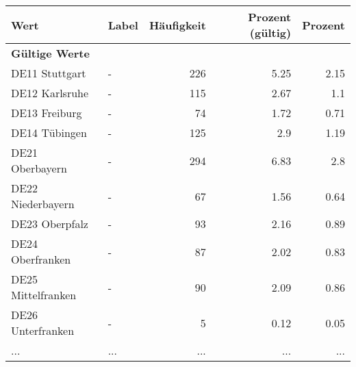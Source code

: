      \begin{longtable}{Xlrrr}
     \toprule
     \textbf{Wert} & \textbf{Label} & \textbf{Häufigkeit} & \textbf{Prozent (gültig)} & \textbf{Prozent} \\
     \endhead
     \midrule
     \multicolumn{5}{l}{\textbf{Gültige Werte}}\\
        \multicolumn{1}{X}{DE11 Stuttgart} & - & \num{226} & \num[round-mode=places,round-precision=2]{5.25} & \num[round-mode=places,round-precision=2]{2.15} \\
        \multicolumn{1}{X}{DE12 Karlsruhe} & - & \num{115} & \num[round-mode=places,round-precision=2]{2.67} & \num[round-mode=places,round-precision=2]{1.1} \\
        \multicolumn{1}{X}{DE13 Freiburg} & - & \num{74} & \num[round-mode=places,round-precision=2]{1.72} & \num[round-mode=places,round-precision=2]{0.71} \\
        \multicolumn{1}{X}{DE14 Tübingen} & - & \num{125} & \num[round-mode=places,round-precision=2]{2.9} & \num[round-mode=places,round-precision=2]{1.19} \\
        \multicolumn{1}{X}{DE21 Oberbayern} & - & \num{294} & \num[round-mode=places,round-precision=2]{6.83} & \num[round-mode=places,round-precision=2]{2.8} \\
        \multicolumn{1}{X}{DE22 Niederbayern} & - & \num{67} & \num[round-mode=places,round-precision=2]{1.56} & \num[round-mode=places,round-precision=2]{0.64} \\
        \multicolumn{1}{X}{DE23 Oberpfalz} & - & \num{93} & \num[round-mode=places,round-precision=2]{2.16} & \num[round-mode=places,round-precision=2]{0.89} \\
        \multicolumn{1}{X}{DE24 Oberfranken} & - & \num{87} & \num[round-mode=places,round-precision=2]{2.02} & \num[round-mode=places,round-precision=2]{0.83} \\
        \multicolumn{1}{X}{DE25 Mittelfranken} & - & \num{90} & \num[round-mode=places,round-precision=2]{2.09} & \num[round-mode=places,round-precision=2]{0.86} \\
        \multicolumn{1}{X}{DE26 Unterfranken} & - & \num{5} & \num[round-mode=places,round-precision=2]{0.12} & \num[round-mode=places,round-precision=2]{0.05} \\
       ... & ... & ... & ... & ... \\

\end{longtable}
